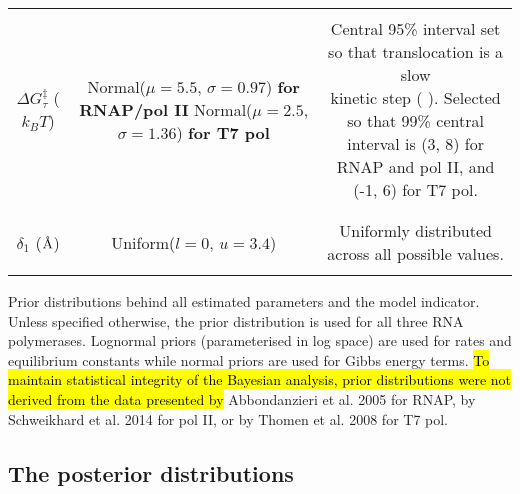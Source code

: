 \documentclass[10pt,letterpaper]{article}
\newcommand{\angstrom}{\mbox{\normalfont\AA}}
\begin{document}
\begin{table}[!htb]
\begin{adjustwidth}{-2.25in}{0in}
{\begin{tabular}{|ccc|}
&&\\
\hline
&&\\

$\Delta G^\ddag_{\tau}$ ($k_B T$) & \makecell{ Normal($\mu = 5.5$, $\sigma = 0.97$) \textbf{for RNAP/pol II} \\ Normal($\mu = 2.5$, $\sigma = 1.36$) \textbf{for T7 pol} } & \makecell{ Central 95\% interval set so that translocation is a slow \\ kinetic step (\nameref{S4_Appendix} ). Selected so that 99\% central \\ interval is (3, 8) for RNAP and pol II, and (-1, 6) for T7 pol.}  \\

&&\\
\hline
&&\\



$\delta_1$ ($\angstrom$) & Uniform($l = 0$, $u = 3.4$) & Uniformly distributed across all possible values. \\

&&\\
\hline



\end{tabular}

}


\label{S2_Table}

\begin{flushleft} Prior distributions behind all estimated parameters and the model indicator. Unless specified otherwise, the prior distribution is used for all three RNA polymerases. Lognormal priors (parameterised in log space) are used for rates and equilibrium constants while normal priors are used for Gibbs energy terms. \hl{To maintain statistical integrity of the Bayesian analysis, prior distributions were not derived from the data presented by} Abbondanzieri et al. 2005 \cite{abbondanzieri2005direct} for RNAP, by Schweikhard et al. 2014 \cite{schweikhard2014transcription} for pol II, or by Thomen et al. 2008 \cite{thomen2008t7} for T7 pol.
\end{flushleft}
\label{table2}
\end{adjustwidth}
\end{table}









\subsection*{The posterior distributions}
\end{document}
